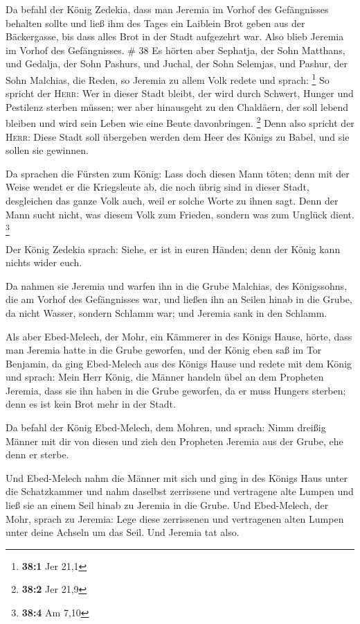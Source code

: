  Da befahl der König Zedekia, dass man Jeremia im Vorhof
des Gefängnisses behalten sollte und ließ ihm des Tages ein Laiblein
Brot geben aus der Bäckergasse, bis dass alles Brot in der Stadt
aufgezehrt war. Also blieb Jeremia im Vorhof des Gefängnisses. \# 38
 Es hörten aber Sephatja, der Sohn Matthans, und Gedalja,
der Sohn Pashurs, und Juchal, der Sohn Selemjas, und Pashur, der Sohn
Malchias, die Reden, so Jeremia zu allem Volk redete und sprach:
\footnote{\textbf{38:1} Jer 21,1}  So spricht der
\textsc{Herr}: Wer in dieser Stadt bleibt, der wird durch Schwert,
Hunger und Pestilenz sterben müssen; wer aber hinausgeht zu den
Chaldäern, der soll lebend bleiben und wird sein Leben wie eine Beute
davonbringen. \footnote{\textbf{38:2} Jer 21,9}  Denn also
spricht der \textsc{Herr}: Diese Stadt soll übergeben werden dem Heer
des Königs zu Babel, und sie sollen sie gewinnen.

 Da sprachen die Fürsten zum König: Lass doch diesen Mann
töten; denn mit der Weise wendet er die Kriegsleute ab, die noch übrig
sind in dieser Stadt, desgleichen das ganze Volk auch, weil er solche
Worte zu ihnen sagt. Denn der Mann sucht nicht, was diesem Volk zum
Frieden, sondern was zum Unglück dient. \footnote{\textbf{38:4} Am 7,10}

 Der König Zedekia sprach: Siehe, er ist in euren Händen;
denn der König kann nichts wider euch.

 Da nahmen sie Jeremia und warfen ihn in die Grube
Malchias, des Königssohns, die am Vorhof des Gefängnisses war, und
ließen ihn an Seilen hinab in die Grube, da nicht Wasser, sondern
Schlamm war; und Jeremia sank in den Schlamm.

 Als aber Ebed-Melech, der Mohr, ein Kämmerer in des
Königs Hause, hörte, dass man Jeremia hatte in die Grube geworfen, und
der König eben saß im Tor Benjamin,  da ging Ebed-Melech
aus des Königs Hause und redete mit dem König und sprach: 
Mein Herr König, die Männer handeln übel an dem Propheten Jeremia, dass
sie ihn haben in die Grube geworfen, da er muss Hungers sterben; denn es
ist kein Brot mehr in der Stadt.

 Da befahl der König Ebed-Melech, dem Mohren, und sprach:
Nimm dreißig Männer mit dir von diesen und zieh den Propheten Jeremia
aus der Grube, ehe denn er sterbe.

 Und Ebed-Melech nahm die Männer mit sich und ging in des
Königs Haus unter die Schatzkammer und nahm daselbst zerrissene und
vertragene alte Lumpen und ließ sie an einem Seil hinab zu Jeremia in
die Grube.  Und Ebed-Melech, der Mohr, sprach zu Jeremia:
Lege diese zerrissenen und vertragenen alten Lumpen unter deine Achseln
um das Seil. Und Jeremia tat also.

